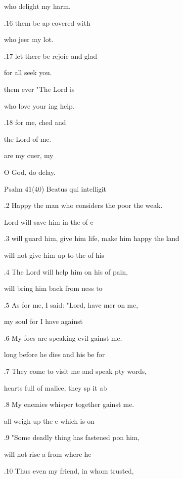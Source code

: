 who delight  my harm. 

.16  them be ap covered with  

who jeer  my lot. 

.17  let there be rejoic and glad 

for all  seek you. 

 them ever  "The Lord is  

who love your ing help. 

.18  for me, ched and  

the Lord  of me. 

 are my cuer, my  

O God, do  delay. 

Psalm 41(40) Beatus qui intelligit 


.2 Happy the man who considers the poor  the weak. 

 Lord will save him in the  of e 

.3 will guard him, give him life, make him happy  the land 

 will not give him up to the  of his  

.4 The Lord will help him on his  of pain, 

 will bring him back from ness to  

.5 As for me, I said: "Lord, have mer on me, 

 my soul for I have  against  

.6 My foes are speaking evil gainst me. 

 long before he dies and his  be for 

.7 They come to visit me and speak pty words, 

 hearts full of malice, they sp it ab 

.8 My enemies whisper together gainst me. 

 all weigh up the e which is on  

.9 "Some deadly thing has fastened pon him, 

 will not rise a from where he  

.10 Thus even my friend, in whom  trusted, 

